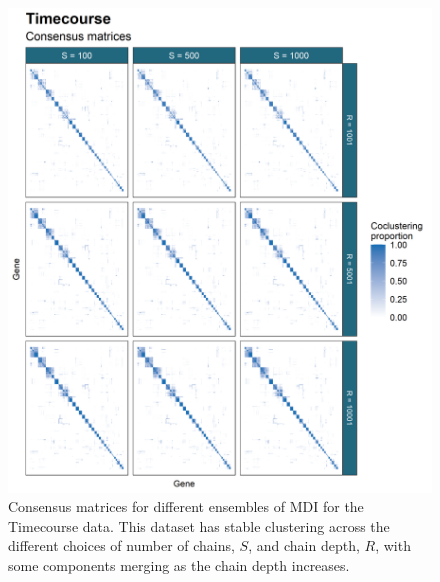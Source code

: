 \documentclass[]{article}
\begin{document}
\begin{figure}
	\centering
	\includegraphics[scale=0.8]{./Images/Yeast/TimecourseCMcomparison.png}
	\caption{Consensus matrices for different ensembles of MDI for the Timecourse data. This dataset has stable clustering across the different choices of number of chains, $S$, and chain depth, $R$, with some components merging as the chain depth increases.}
	\label{fig:timecourseCMs}
\end{figure}
\end{document}
